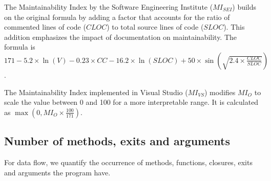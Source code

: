 The Maintainability Index by the Software Engineering Institute (\(MI_{SEI}\)) builds on the original formula by
adding a factor that accounts for the ratio of commented lines of code (\(CLOC\)) to total source lines of code (\(SLOC\)).
This addition emphasizes the impact of documentation on maintainability.
The formula is \(171 - 5.2 \times \ln(V) - 0.23 \times CC - 16.2 \times \ln(SLOC) + 50 \times \sin(\sqrt{2.4 \times \frac{CLOC}{SLOC}})\).

The Maintainability Index implemented in Visual Studio (\(MI_{VS}\)) modifies \(MI_O\) to scale the value
between 0 and 100 for a more interpretable range.
It is calculated as \(\max(0, MI_O \times \frac{100}{171})\).

\subsection{Number of methods, exits and arguments}

For data flow, we quantify the occurrence of methods, functions, closures, exits and arguments the program have.

